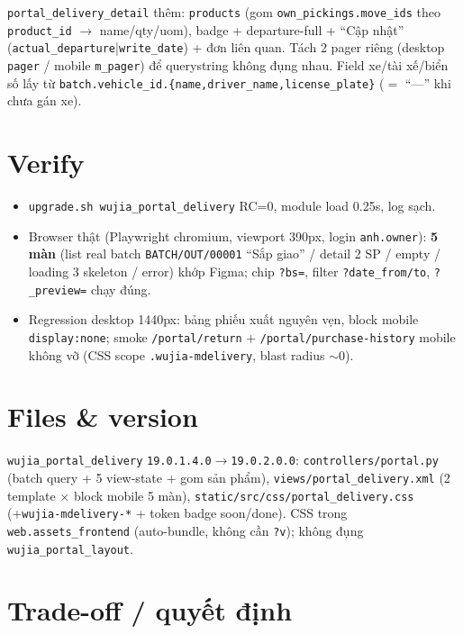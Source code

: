 \texttt{portal\_delivery\_detail} thêm: \texttt{products} (gom \texttt{own\_pickings.move\_ids} theo \texttt{product\_id} \(\rightarrow\) name/qty/uom), badge + departure-full + ``Cập nhật'' (\texttt{actual\_departure}|\texttt{write\_date}) + đơn liên quan. Tách 2 pager riêng (desktop \texttt{pager} / mobile \texttt{m\_pager}) để querystring không đụng nhau. Field xe/tài xế/biển số lấy từ \texttt{batch.vehicle\_id.\{name,driver\_name,license\_plate\}} (\(=\) ``---'' khi chưa gán xe).

\section{Verify}

\begin{itemize}
  \item \texttt{upgrade.sh wujia\_portal\_delivery} RC=0, module load 0.25s, log sạch.
  \item Browser thật (Playwright chromium, viewport 390px, login \texttt{anh.owner}): \textbf{5 màn} (list real batch \texttt{BATCH/OUT/00001} ``Sắp giao'' / detail 2 SP / empty / loading 3 skeleton / error) khớp Figma; chip \texttt{?bs=}, filter \texttt{?date\_from/to}, \texttt{?\_preview=} chạy đúng.
  \item Regression desktop 1440px: bảng phiếu xuất nguyên vẹn, block mobile \texttt{display:none}; smoke \texttt{/portal/return} + \texttt{/portal/purchase-history} mobile không vỡ (CSS scope \texttt{.wujia-mdelivery}, blast radius \(\sim\)0).
\end{itemize}

\section{Files \& version}

\texttt{wujia\_portal\_delivery} \texttt{19.0.1.4.0}\(\rightarrow\)\texttt{19.0.2.0.0}: \texttt{controllers/portal.py} (batch query + 5 view-state + gom sản phẩm), \texttt{views/portal\_delivery.xml} (2 template \(\times\) block mobile 5 màn), \texttt{static/src/css/portal\_delivery.css} (+\texttt{wujia-mdelivery-*} + token badge soon/done). CSS trong \texttt{web.assets\_frontend} (auto-bundle, không cần \texttt{?v}); không đụng \texttt{wujia\_portal\_layout}.

\section{Trade-off / quyết định}

